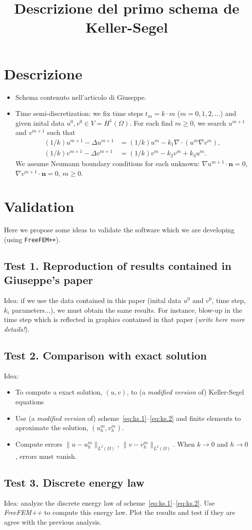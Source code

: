 \documentclass[a4wide]{article}
\title{Descrizione del primo schema de Keller-Segel}
\newcommand{\um}{u^m}
\newcommand{\umm}{u^{m+1}}
\newcommand{\vm}{v^m}
\newcommand{\vmm}{v^{m+1}}
\newcommand{\grad}{\nabla}
\renewcommand{\div}{\nabla\cdot}
\newcommand{\nn}{\mathbf{n}}
\begin{document}
\maketitle

\section{Descrizione}

\begin{itemize}
\item Schema contenuto nell'articolo di Giuseppe.
\item Time
  semi-discretization: we fix time steps $t_m=k\cdot m$
  ($m=0,1,2,...$) and given inital data $u^0,v^0 \in
  V=H^1(\Omega)$.
  For each find $m\ge 0$, we search $\umm$ and $\vmm$ such that
  \begin{align}
    \label{eq:ks.1}
    (1/k) \umm - \Delta \umm &= (1/k) \um - k_1 \div(\um \grad \vm),
    \\
    \label{eq:ks.2}
    (1/k) \vmm - \Delta \vmm &= (1/k) \vm - k_2 \vm + k_3 \um.
  \end{align}
  We assume Neumann boundary conditions for each unknown:
  $\grad \umm \cdot \nn=0$, $\grad \vmm \cdot \nn=0$, $m\ge 0$.
\end{itemize}

\section{Validation}
Here we propose some ideas to validate the software
which we are developing (using \texttt{FreeFEM++}).

\subsection*{Test 1. Reproduction of results contained in Giuseppe's paper}

Idea: if we use the data contained in this paper (inital data $u^0$
and $v^0$, time step, $k_i$ parameters...), we must obtain the same
results. For instance, blow-up in the time step which is reflected in
graphics contained in that paper (\textit{write here more details!}).

\subsection*{Test 2. Comparison with exact solution}

Idea:
\begin{itemize}
\item To compute a exact solution, $(u,v)$, to (a \textit{modified version} of)
  Keller-Segel equations
\item Use (a \textit{modified version} of)
  scheme~\eqref{eq:ks.1}--\eqref{eq:ks.2} and finite elements to
  aproximate the solution, $(\um_h, \vm_h)$.
\item Compute errors $\|u-\um_h\|_{L^2(\Omega)}$,
  $\|v-\vm_h\|_{L^2(\Omega)}$. When $k\to 0$ and $h\to 0$, errors must
  vanish.
\end{itemize}

\subsection*{Test 3. Discrete energy law}

Idea: analyze the discrete energy law of
scheme~\eqref{eq:ks.1}--\eqref{eq:ks.2}. Use \textit{FreeFEM++} to
compute this energy law. Plot the results and test if they are
agree with the previous analysis.
\end{document}

